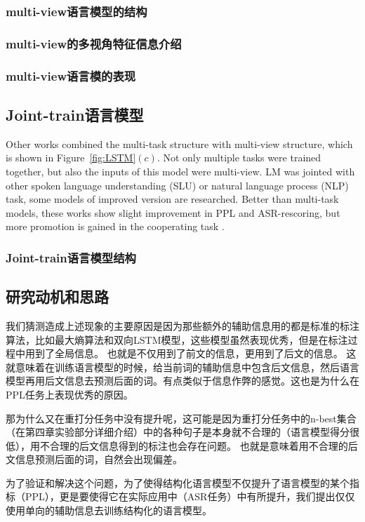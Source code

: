 \subsubsection{multi-view语言模型的结构}
\subsubsection{multi-view的多视角特征信息介绍}
\subsubsection{multi-view语言模的表现}

\subsection{Joint-train语言模型}
Other works combined the multi-task structure with multi-view structure, which is shown in Figure~\ref{fig:LSTM}$(c)$. Not only multiple tasks were trained together, but also the inputs of this model were multi-view. LM was jointed with other spoken language understanding (SLU) or natural language process (NLP) task, some models of improved version are researched. Better than multi-task models, these works show slight improvement in PPL and ASR-rescoring, but more promotion is gained in the cooperating task \cite{Liu2016Joint}.


\subsubsection{Joint-train语言模型结构}
\subsection{研究动机和思路}
我们猜测造成上述现象的主要原因是因为那些额外的辅助信息用的都是标准的标注算法，比如最大熵算法和双向LSTM模型，这些模型虽然表现优秀，但是在标注过程中用到了全局信息。
也就是不仅用到了前文的信息，更用到了后文的信息。
这就意味着在训练语言模型的时候，给当前词的辅助信息中包含后文信息，然后语言模型再用后文信息去预测后面的词。有点类似于信息作弊的感觉。这也是为什么在PPL任务上表现优秀的原因。

那为什么又在重打分任务中没有提升呢，这可能是因为重打分任务中的n-best集合（在第四章实验部分详细介绍）中的各种句子是本身就不合理的（语言模型得分很低），用不合理的后文信息得到的标注也会存在问题。
也就是意味着用不合理的后文信息预测后面的词，自然会出现偏差。

为了验证和解决这个问题，为了使得结构化语言模型不仅提升了语言模型的某个指标（PPL），更是要使得它在实际应用中（ASR任务）中有所提升，我们提出仅仅使用单向的辅助信息去训练结构化的语言模型。

